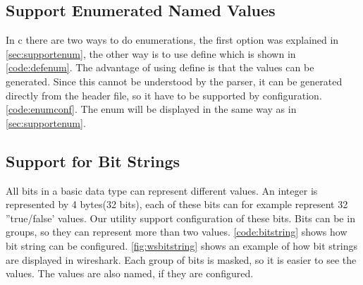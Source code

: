 \subsection{Support Enumerated Named Values}
In \Gls{c} there are two ways to do enumerations, the first option was explained in 
\autoref{sec:supportenum}, the other way is to use \gls{define} which is shown in 
\autoref{code:defenum}. The advantage of using \gls{define} is that the values 
can be generated. Since this cannot be understood by the \gls{parser}, it can be 
generated directly from the \gls{header} file, so it have to be supported by 
configuration. \autoref{code:enumconf}. The \gls{enum} will be displayed in 
the same way as in \autoref{sec:supportenum}.





\subsection{Support for Bit Strings}
All bits in a basic data type can represent different values. An \gls{integer} is 
represented by 4 bytes(32 bits), each of these bits can for example represent 
32 ''true/false' values. Our \gls{utility} support configuration of these bits. Bits 
can be in groups, so they can represent more than two values. 
\autoref{code:bitstring} shows how \gls{bit string} can be configured. 
\autoref{fig:wsbitstring} shows an example of how \glspl{bit string} are displayed in 
\Gls{wireshark}. Each group of bits is masked, so it is easier to see the values. 
The values are also named, if they are configured.

